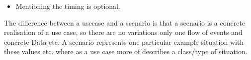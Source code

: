\begin{parlist}
\begin{enumerate}
\begin{itemize}
					\item Mentioning the timing is optional.
				\end{itemize}			
		\end{enumerate}
	\item The difference between a usecase and a scenario is that a scenario is a concrete realisation of a use case, so there are no variations only one flow of events and concrete Data etc. A scenario represents one particular example situation with these values etc. where as a use case more of describes a class/type of situation. 
\end{parlist}
